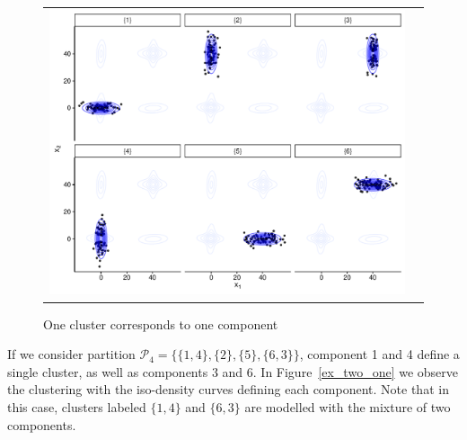 \documentclass[10pt, a4paper]{article}
\begin{document}
\begin{spacing}{1.9}
\begin{figure}[h]
\begin{center}
\begin{tabular}{cc}
  \includegraphics[width=\textwidth]{figures/partition-example-part6.pdf} \\
 \end{tabular}
 \caption{One cluster corresponds to one component}\label{ex_one_one}
\end{center}
\end{figure}

If we consider partition $\mathcal{P}_4 = \{ \{1, 4\},\{2\}, \{5\}, \{6, 3\} \}$, component 1 and 4 define a single cluster, as well as components 3 and 6. In Figure~\ref{ex_two_one} we observe the clustering with the iso-density curves defining each component. Note that in this case, clusters labeled $\{1,4\}$ and $\{6, 3\}$ are modelled with the mixture of two components.


\end{spacing}
\end{document}
